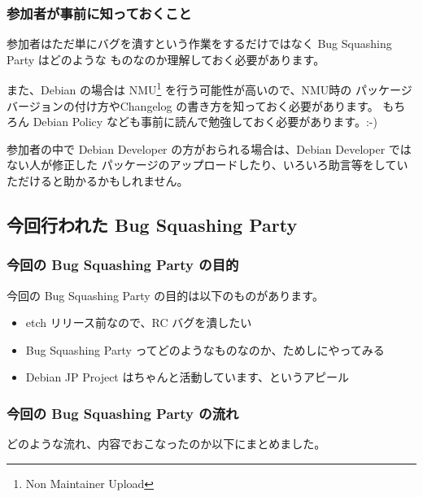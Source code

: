 \documentclass[mingoth,a4paper]{jsarticle}
\begin{document}
\subsubsection{参加者が事前に知っておくこと}

参加者はただ単にバグを潰すという作業をするだけではなく Bug Squashing Party はどのような
ものなのか理解しておく必要があります。

また、Debian の場合は NMU\footnote{Non Maintainer Upload} を行う可能性が高いので、NMU時の
パッケージバージョンの付け方やChangelog の書き方を知っておく必要があります。
もちろん Debian Policy なども事前に読んで勉強しておく必要があります。:-)


参加者の中で Debian Developer の方がおられる場合は、Debian Developer ではない人が修正した
パッケージのアップロードしたり、いろいろ助言等をしていただけると助かるかもしれません。

\subsection{今回行われた Bug Squashing Party }

\subsubsection{今回の Bug Squashing Party の目的}
今回の Bug Squashing Party の目的は以下のものがあります。

\begin{itemize}
	\item etch リリース前なので、RC バグを潰したい
	\item Bug Squashing Party ってどのようなものなのか、ためしにやってみる
	\item Debian JP Project はちゃんと活動しています、というアピール
\end{itemize}

\subsubsection{今回の Bug Squashing Party の流れ}

どのような流れ、内容でおこなったのか以下にまとめました。
\end{document}
